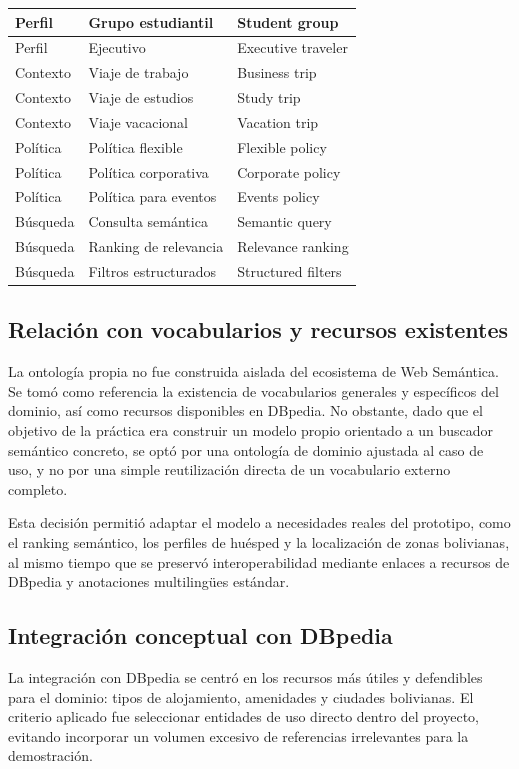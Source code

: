\begin{longtable}{|p{3.3cm}|p{5.2cm}|p{5.2cm}|}
Perfil & Grupo estudiantil & Student group \\
\hline
Perfil & Ejecutivo & Executive traveler \\
\hline
Contexto & Viaje de trabajo & Business trip \\
\hline
Contexto & Viaje de estudios & Study trip \\
\hline
Contexto & Viaje vacacional & Vacation trip \\
\hline
Política & Política flexible & Flexible policy \\
\hline
Política & Política corporativa & Corporate policy \\
\hline
Política & Política para eventos & Events policy \\
\hline
Búsqueda & Consulta semántica & Semantic query \\
\hline
Búsqueda & Ranking de relevancia & Relevance ranking \\
\hline
Búsqueda & Filtros estructurados & Structured filters \\
\hline
\end{longtable}

\subsection{Relación con vocabularios y recursos existentes}

La ontología propia no fue construida aislada del ecosistema de Web Semántica. Se tomó
como referencia la existencia de vocabularios generales y específicos del dominio, así
como recursos disponibles en DBpedia. No obstante, dado que el objetivo de la práctica
era construir un modelo propio orientado a un buscador semántico concreto, se optó por
una ontología de dominio ajustada al caso de uso, y no por una simple reutilización
directa de un vocabulario externo completo.

Esta decisión permitió adaptar el modelo a necesidades reales del prototipo, como el
ranking semántico, los perfiles de huésped y la localización de zonas bolivianas, al
mismo tiempo que se preservó interoperabilidad mediante enlaces a recursos de DBpedia y
anotaciones multilingües estándar.

\subsection{Integración conceptual con DBpedia}

La integración con DBpedia se centró en los recursos más útiles y defendibles para el
dominio: tipos de alojamiento, amenidades y ciudades bolivianas. El criterio aplicado
fue seleccionar entidades de uso directo dentro del proyecto, evitando incorporar un
volumen excesivo de referencias irrelevantes para la demostración.

